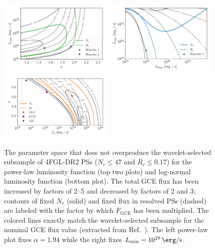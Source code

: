 \documentclass[letter,11pt]{article}
\begin{document}
\begin{figure}
    \centering
    \includegraphics[width=0.49\textwidth]{figs/power-law-alpha-mult.pdf}
    \includegraphics[width=0.49\textwidth]{figs/power-law-mult.pdf}
    \includegraphics[width=0.49\textwidth]{figs/log-normal-mult.pdf}
    \caption{The parameter space that does not overproduce the wavelet-selected subsample of 4FGL-DR2 PSs ($N_r \leq 47$ and $R_r \leq 0.17$) for the power-law luminosity function (top two plots) and log-normal luminosity function (bottom plot). The total GCE flux has been increased by factors of 2--5 and decreased by factors of 2 and 3; contours of fixed $N_r$ (solid) and fixed flux in resolved PSs (dashed) are labeled with the factor by which $F_\text{GCE}$ has been multiplied. The colored lines exactly match the wavelet-selected subsample for the nominal GCE flux value (extracted from Ref.~\cite{DiMauro:2021raz}). The left power-law plot fixes $\alpha=1.94$ while the right fixes $L_\text{min}=\SI{e29}{\erg\per\second}$.}
    \label{fig:multiple-fluxes}
\end{figure}
\end{document}
